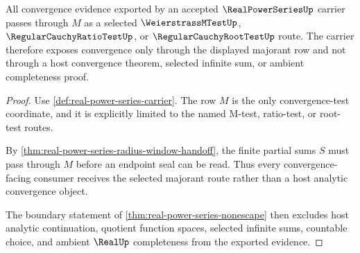 \begin{theorem}\label{thm:real-power-series-majorant-route-totality}
All convergence evidence exported by an accepted $\RealPowerSeriesUp$ carrier passes through $M$ as a selected $\WeierstrassMTestUp$, $\RegularCauchyRatioTestUp$, or $\RegularCauchyRootTestUp$ route. The carrier therefore exposes convergence only through the displayed majorant row and not through a host convergence theorem, selected infinite sum, or ambient completeness proof.
\end{theorem}
\begin{proof}
Use \autoref{def:real-power-series-carrier}. The row $M$ is the only convergence-test coordinate, and it is explicitly limited to the named M-test, ratio-test, or root-test routes.

By \autoref{thm:real-power-series-radius-window-handoff}, the finite partial sums $S$ must pass through $M$ before an endpoint seal can be read. Thus every convergence-facing consumer receives the selected majorant route rather than a host analytic convergence object.

The boundary statement of \autoref{thm:real-power-series-nonescape} then excludes host analytic continuation, quotient function spaces, selected infinite sums, countable choice, and ambient $\RealUp$ completeness from the exported evidence.
\end{proof}

